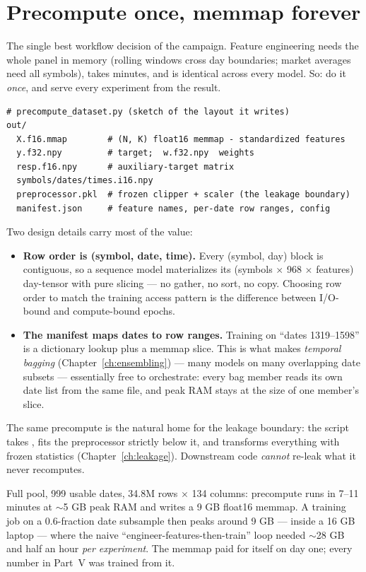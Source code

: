 \section{Precompute once, memmap forever}

The single best workflow decision of the campaign. Feature engineering
needs the whole panel in memory (rolling windows cross day boundaries;
market averages need all symbols), takes minutes, and is identical across
every model. So: do it \emph{once}, and serve every experiment from the
result.

\begin{lstlisting}
# precompute_dataset.py (sketch of the layout it writes)
out/
  X.f16.mmap        # (N, K) float16 memmap - standardized features
  y.f32.npy         # target;  w.f32.npy  weights
  resp.f16.npy      # auxiliary-target matrix
  symbols/dates/times.i16.npy
  preprocessor.pkl  # frozen clipper + scaler (the leakage boundary)
  manifest.json     # feature names, per-date row ranges, config
\end{lstlisting}

Two design details carry most of the value:

\begin{itemize}
\item \textbf{Row order is (symbol, date, time).} Every (symbol, day) block
  is contiguous, so a sequence model materializes its
  (symbols $\times$ 968 $\times$ features) day-tensor with pure slicing ---
  no gather, no sort, no copy. Choosing row order to match the training
  access pattern is the difference between I/O-bound and compute-bound
  epochs.
\item \textbf{The manifest maps dates to row ranges.} Training on ``dates
  1319--1598'' is a dictionary lookup plus a memmap slice. This is what
  makes \emph{temporal bagging} (Chapter~\ref{ch:ensembling}) --- many
  models on many overlapping date subsets --- essentially free to
  orchestrate: every bag member reads its own date list from the same
  file, and peak RAM stays at the size of one member's slice.
\end{itemize}

The same precompute is the natural home for the leakage boundary: the
script takes , fits the preprocessor strictly below
it, and transforms everything with frozen statistics
(Chapter~\ref{ch:leakage}). Downstream code \emph{cannot} re-leak what it
never recomputes.

\begin{jsbox}
Full pool, 999 usable dates, 34.8M rows $\times$ 134 columns: precompute
runs in 7--11 minutes at $\sim$5 GB peak RAM and writes a 9 GB float16
memmap. A training job on a 0.6-fraction date subsample then peaks around
9 GB --- inside a 16 GB laptop --- where the naive
``engineer-features-then-train'' loop needed $\sim$28 GB and half an hour
\emph{per experiment}. The memmap paid for itself on day one; every
number in Part~V was trained from it.
\end{jsbox}

